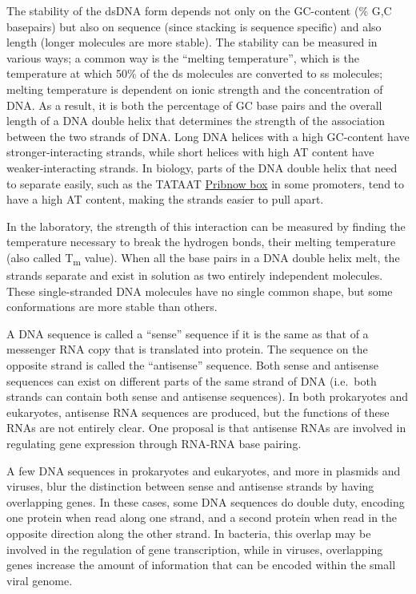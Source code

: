 The stability of the dsDNA form depends not only on the GC-content (\% G,C basepairs) but also on sequence (since stacking is sequence specific) and also length (longer molecules are more stable). The stability can be measured in various ways; a common way is the ``melting temperature'', which is the temperature at which 50\% of the ds molecules are converted to ss molecules; melting temperature is dependent on ionic strength and the concentration of DNA. As a result, it is both the percentage of GC base pairs and the overall length of a DNA double helix that determines the strength of the association between the two strands of DNA. Long DNA helices with a high GC-content have stronger-interacting strands, while short helices with high AT content have weaker-interacting strands. In biology, parts of the DNA double helix that need to separate easily, such as the TATAAT \href{https://en.wikipedia.org/wiki/Pribnow_box}{Pribnow box} in some promoters, tend to have a high AT content, making the strands easier to pull apart.

In the laboratory, the strength of this interaction can be measured by finding the temperature necessary to break the hydrogen bonds, their melting temperature (also called T\textsubscript{m} value). When all the base pairs in a DNA double helix melt, the strands separate and exist in solution as two entirely independent molecules. These single-stranded DNA molecules have no single common shape, but some conformations are more stable than others.

A DNA sequence is called a ``sense'' sequence if it is the same as that of a messenger RNA copy that is translated into protein. The sequence on the opposite strand is called the ``antisense'' sequence. Both sense and antisense sequences can exist on different parts of the same strand of DNA (i.e.~both strands can contain both sense and antisense sequences). In both prokaryotes and eukaryotes, antisense RNA sequences are produced, but the functions of these RNAs are not entirely clear. One proposal is that antisense RNAs are involved in regulating gene expression through RNA-RNA base pairing.

A few DNA sequences in prokaryotes and eukaryotes, and more in plasmids and viruses, blur the distinction between sense and antisense strands by having overlapping genes. In these cases, some DNA sequences do double duty, encoding one protein when read along one strand, and a second protein when read in the opposite direction along the other strand. In bacteria, this overlap may be involved in the regulation of gene transcription, while in viruses, overlapping genes increase the amount of information that can be encoded within the small viral genome.

